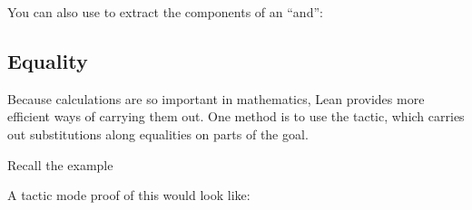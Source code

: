 \documentclass[letterpaper,10pt,english]{sphinxmanual}
\begin{document}
\sphinxAtStartPar
You can also use  to extract the components of an “and”:

\begin{sphinxVerbatim}[commandchars=\\\{\}]
    

          
     
         
   
  
\end{sphinxVerbatim}


\subsection{Equality}
\label{\detokenize{first_order_logic_in_lean:id2}}
\sphinxAtStartPar
Because calculations are so important in mathematics,
Lean provides more efficient ways of carrying them out.
One method is to use the  tactic,
which carries out substitutions along equalities on parts of the goal.

\sphinxAtStartPar
Recall the example

\begin{sphinxVerbatim}[commandchars=\\\{\}]
             
       
\end{sphinxVerbatim}

\sphinxAtStartPar
A tactic mode proof of this would look like:

\begin{sphinxVerbatim}[commandchars=\\\{\}]
              
            
   \PYG{o}{[}\PYG{o}{]}
   
\end{sphinxVerbatim}
\end{document}

